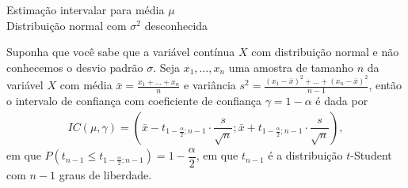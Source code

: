\documentclass[8pt]{beamer}
\begin{document}
\begin{frame}{Estimação intervalar para média $\mu$\\ Distribuição normal com $\sigma^2$ desconhecida}
\Large

	Suponha que você sabe que a variável contínua $X$ com distribuição normal e não conhecemos o desvio padrão $\sigma$. Seja $x_1, \dots, x_n$ uma amostra de tamanho $n$ da variável $X$ com média $\bar{x} = \frac{x_1 + \dots + x_n}{n}$ e variância $s^2 = \frac{(x_1 - \bar{x})^2 + \dots + (x_n - \bar{x})^2}{n-1}$, então o intervalo de confiança com coeficiente de confiança $\gamma = 1-\alpha$ é dada por
	\begin{align*}
		IC(\mu, \gamma) = \left( \bar{x} - t_{1-\frac{\alpha}{2};n-1} \cdot  \dfrac{s}{\sqrt{n}}; \bar{x} + t_{1-\frac{\alpha}{2};n-1} \cdot  \dfrac{s}{\sqrt{n}} \right),
	\end{align*}
	em que $P\left( t_{n-1} \leq t_{1-\frac{\alpha}{2};n-1}  \right) = 1 - \dfrac{\alpha}{2}$, em que $t_{n-1}$ é a distribuição $t$-Student com $n-1$ graus de liberdade.
	
\normalsize
\end{frame}
\end{document}
